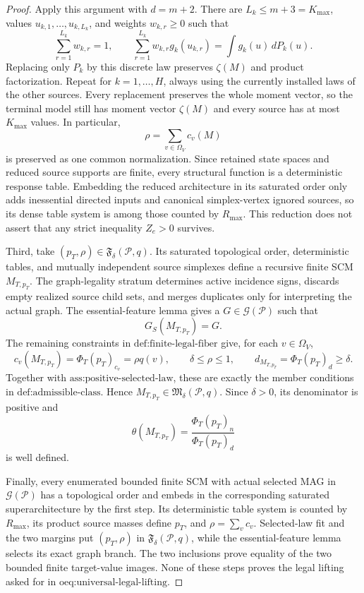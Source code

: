 \documentclass{article}
\begin{document}
\begin{proof}
Apply this argument with \(d=m+2\).  There are \(L_k\leq m+3=K_{\max}\), values \(u_{k,1},\ldots,u_{k,L_k}\), and weights \(w_{k,r}\geq0\) such that
\[
\sum_{r=1}^{L_k}w_{k,r}=1,
\qquad
\sum_{r=1}^{L_k}w_{k,r}g_k(u_{k,r})
=\int g_k(u)\,dP_k(u).
\]
Replacing only \(P_k\) by this discrete law preserves \(\zeta(M)\) and product factorization.  Repeat for \(k=1,\ldots,H\), always using the currently installed laws of the other sources.  Every replacement preserves the whole moment vector, so the terminal model still has moment vector \(\zeta(M)\) and every source has at most \(K_{\max}\) values.  In particular,
\[
\rho=\sum_{v\in\Omega_V}c_v(M)
\]
is preserved as one common normalization.  Since retained state spaces and reduced source supports are finite, every structural function is a deterministic response table.  Embedding the reduced architecture in its saturated order only adds inessential directed inputs and canonical simplex-vertex ignored sources, so its dense table system is among those counted by \(R_{\max}\).  This reduction does not assert that any strict inequality \(Z_e>0\) survives.

Third, take \((p_T,\rho)\in\mathfrak F_\delta(\mathcal P,q)\).  Its saturated topological order, deterministic tables, and mutually independent source simplexes define a recursive finite SCM \(M_{T,p_T}\).  The graph-legality stratum determines active incidence signs, discards empty realized source child sets, and merges duplicates only for interpreting the actual graph.  The essential-feature lemma gives a \(G\in\mathcal G(\mathcal P)\) such that
\[
G_S(M_{T,p_T})=G.
\]
The remaining constraints in \(\text{def:finite-legal-fiber}\) give, for each \(v\in\Omega_V\),
\[
c_v(M_{T,p_T})=\Phi_T(p_T)_{c_v}=\rho q(v),
\qquad
\delta\leq\rho\leq1,
\qquad
d_{M_{T,p_T}}=\Phi_T(p_T)_d\geq\delta.
\]
Together with \(\text{ass:positive-selected-law}\), these are exactly the member conditions in \(\text{def:admissible-class}\).  Hence \(M_{T,p_T}\in\mathfrak M_\delta(\mathcal P,q)\).  Since \(\delta>0\), its denominator is positive and
\[
\theta(M_{T,p_T})=
\frac{\Phi_T(p_T)_n}{\Phi_T(p_T)_d}
\]
is well defined.

Finally, every enumerated bounded finite SCM with actual selected MAG in \(\mathcal G(\mathcal P)\) has a topological order and embeds in the corresponding saturated superarchitecture by the first step.  Its deterministic table system is counted by \(R_{\max}\), its product source masses define \(p_T\), and \(\rho=\sum_vc_v\).  Selected-law fit and the two margins put \((p_T,\rho)\) in \(\mathfrak F_\delta(\mathcal P,q)\), while the essential-feature lemma selects its exact graph branch.  The two inclusions prove equality of the two bounded finite target-value images.  None of these steps proves the legal lifting asked for in \(\text{oeq:universal-legal-lifting}\).
\end{proof}
\end{document}
